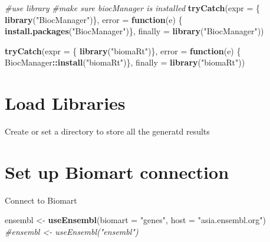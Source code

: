 \documentclass[
]{book}
\newenvironment{Shaded}{\begin{snugshade}}{\end{snugshade}}
\newcommand{\AttributeTok}[1]{\textcolor[rgb]{0.13,0.29,0.53}{#1}}
\newcommand{\CommentTok}[1]{\textcolor[rgb]{0.56,0.35,0.01}{\textit{#1}}}
\newcommand{\ControlFlowTok}[1]{\textcolor[rgb]{0.13,0.29,0.53}{\textbf{#1}}}
\newcommand{\FunctionTok}[1]{\textcolor[rgb]{0.13,0.29,0.53}{\textbf{#1}}}
\newcommand{\NormalTok}[1]{#1}
\newcommand{\OtherTok}[1]{\textcolor[rgb]{0.56,0.35,0.01}{#1}}
\newcommand{\SpecialCharTok}[1]{\textcolor[rgb]{0.81,0.36,0.00}{\textbf{#1}}}
\newcommand{\StringTok}[1]{\textcolor[rgb]{0.31,0.60,0.02}{#1}}
\begin{document}
\begin{Shaded}
\begin{Highlighting}[]
\CommentTok{\#use library}
\CommentTok{\#make sure biocManager is installed}
\FunctionTok{tryCatch}\NormalTok{(}\AttributeTok{expr =}\NormalTok{ \{ }\FunctionTok{library}\NormalTok{(}\StringTok{"BiocManager"}\NormalTok{)\}, }
         \AttributeTok{error =} \ControlFlowTok{function}\NormalTok{(e) \{ }
           \FunctionTok{install.packages}\NormalTok{(}\StringTok{"BiocManager"}\NormalTok{)\}, }
         \AttributeTok{finally =} \FunctionTok{library}\NormalTok{(}\StringTok{"BiocManager"}\NormalTok{))}


\FunctionTok{tryCatch}\NormalTok{(}\AttributeTok{expr =}\NormalTok{ \{ }\FunctionTok{library}\NormalTok{(}\StringTok{"biomaRt"}\NormalTok{)\}, }
         \AttributeTok{error =} \ControlFlowTok{function}\NormalTok{(e) \{ }
\NormalTok{           BiocManager}\SpecialCharTok{::}\FunctionTok{install}\NormalTok{(}\StringTok{"biomaRt"}\NormalTok{)\}, }
         \AttributeTok{finally =} \FunctionTok{library}\NormalTok{(}\StringTok{"biomaRt"}\NormalTok{))}
\end{Highlighting}
\end{Shaded}

\section{Load Libraries}\label{load-libraries}

Create or set a directory to store all the generatd results

\begin{Shaded}
\end{Shaded}

\section{Set up Biomart connection}\label{set-up-biomart-connection}

Connect to Biomart

\begin{Shaded}
\begin{Highlighting}[]
\NormalTok{ensembl }\OtherTok{\textless{}{-}} \FunctionTok{useEnsembl}\NormalTok{(}\AttributeTok{biomart =} \StringTok{"genes"}\NormalTok{, }\AttributeTok{host =} \StringTok{"asia.ensembl.org"}\NormalTok{)}
\CommentTok{\#ensembl \textless{}{-} useEnsembl("ensembl")}
\end{Highlighting}
\end{Shaded}
\end{document}
